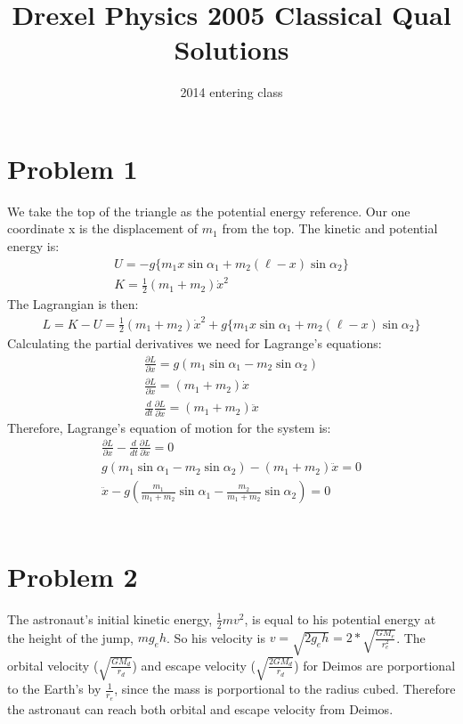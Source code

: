 \documentclass[a4paper,11pt]{article}
\title{Drexel Physics 2005 Classical Qual Solutions}
\author{2014 entering class}
\numberwithin{equation}{section}
\begin{document}
\maketitle

\section{Problem 1}
We take the top of the triangle as the potential energy reference. 
Our one coordinate x is the displacement of $m_1$ from the top.
The kinetic and potential energy is:
\begin{gather}
 U=-g\{m_1x\sin{\alpha _1}+m_2(\ell-x)\sin{\alpha _2} \}\\
 K = \frac{1}{2}(m_1+m_2)\dot{x}^2
\end{gather}
The Lagrangian is then:
\begin{gather}
 L=K-U=\frac{1}{2}(m_1+m_2)\dot{x}^2+g\{m_1x\sin{\alpha _1}+m_2(\ell-x)\sin{\alpha _2} \}
\end{gather}
Calculating the partial derivatives we need for Lagrange's equations:
\begin{gather}
 \frac{\partial L}{\partial x}=g(m_1\sin{\alpha_1}-m_2\sin{\alpha_2})\\
 \frac{\partial L}{\partial \dot{x}}=(m_1+m_2)\dot{x}\\
 \frac{d}{dt}\frac{\partial L}{\partial \dot{x}}=(m_1+m_2)\ddot{x}
\end{gather}
Therefore, Lagrange's equation of motion for the system is:
\begin{gather}
 \frac{\partial L}{\partial x}-\frac{d}{dt}\frac{\partial L}{\partial \dot{x}}=0\\
 g(m_1\sin{\alpha_1}-m_2\sin{\alpha_2})-(m_1+m_2)\ddot{x}=0\\
 \ddot{x}-g(\frac{m_1}{m_1+m_2}\sin{\alpha_1}-\frac{m_2}{m_1+m_2}\sin{\alpha_2})=0
\end{gather}
\\
\section{Problem 2}
The astronaut's initial kinetic energy, $\frac{1}{2}mv^2$, is equal to his potential energy at the height of the jump, $m g_e h$.
So his velocity is $v=\sqrt{2g_e h}=2*\sqrt{\frac{GM_e}{r_e^2}}$.
The orbital velocity ($\sqrt{\frac{GM_d}{r_d}}$) and escape velocity ($\sqrt{\frac{2GM_d}{r_d}}$) for Deimos are porportional to the Earth's 
by $\frac{1}{r_e}$, since the mass is porportional to the radius cubed. 
Therefore the astronaut can reach both orbital and escape velocity from Deimos.
\\
\end{document}
